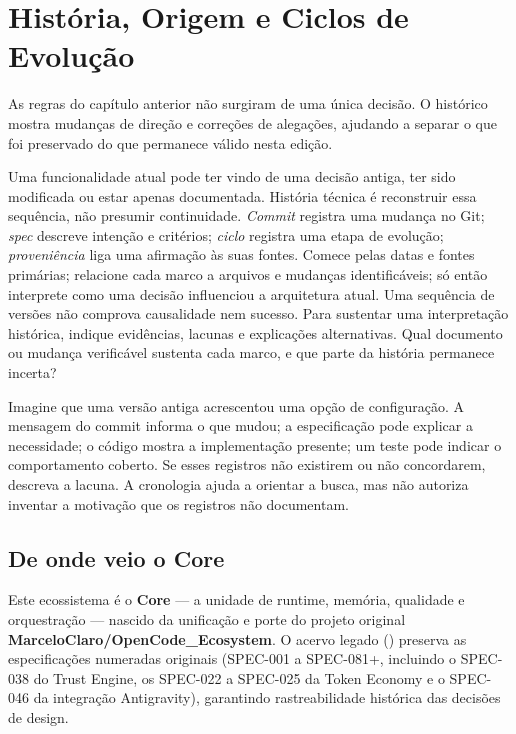 \chapter{História, Origem e Ciclos de Evolução}

As regras do capítulo anterior não surgiram de uma única decisão. O histórico mostra mudanças de direção e correções de alegações, ajudando a separar o que foi preservado do que permanece válido nesta edição.


\roteirodidatico
{Uma funcionalidade atual pode ter vindo de uma decisão antiga, ter sido modificada ou estar apenas documentada. História técnica é reconstruir essa sequência, não presumir continuidade.}
{\emph{Commit} registra uma mudança no Git; \emph{spec} descreve intenção e critérios; \emph{ciclo} registra uma etapa de evolução; \emph{proveniência} liga uma afirmação às suas fontes.}
{Comece pelas datas e fontes primárias; relacione cada marco a arquivos e mudanças identificáveis; só então interprete como uma decisão influenciou a arquitetura atual.}
{Uma sequência de versões não comprova causalidade nem sucesso. Para sustentar uma interpretação histórica, indique evidências, lacunas e explicações alternativas.}
{Qual documento ou mudança verificável sustenta cada marco, e que parte da história permanece incerta?}

{Imagine que uma versão antiga acrescentou uma opção de configuração. A mensagem do commit informa o que mudou; a especificação pode explicar a necessidade; o código mostra a implementação presente; um teste pode indicar o comportamento coberto. Se esses registros não existirem ou não concordarem, descreva a lacuna. A cronologia ajuda a orientar a busca, mas não autoriza inventar a motivação que os registros não documentam.}

\section{De onde veio o Core}


\begin{conceito}
Este ecossistema é o \textbf{Core} — a unidade de runtime, memória, qualidade e
orquestração — nascido da unificação e porte do projeto original
\textbf{MarceloClaro/OpenCode\_Ecosystem}. O acervo legado ()
preserva as especificações numeradas originais (SPEC-001 a SPEC-081+, incluindo o
SPEC-038 do Trust Engine, os SPEC-022 a SPEC-025 da Token Economy e o SPEC-046 da
integração Antigravity), garantindo rastreabilidade histórica das decisões de
design.
\end{conceito}

